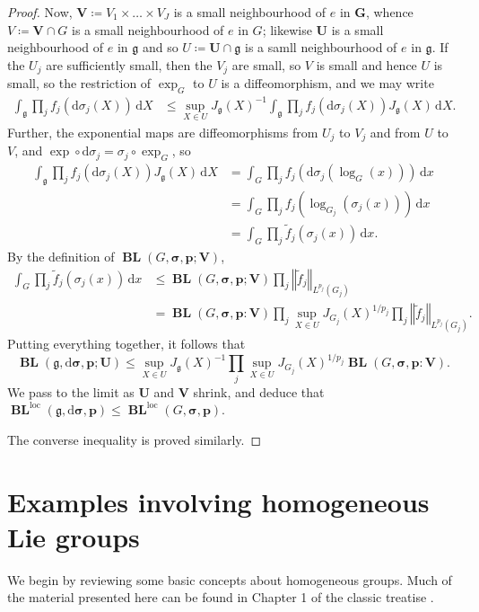 \documentclass[12pt,twoside,a4paper]{amsart}
\theoremstyle{definition}
\theoremstyle{remark}
\numberwithin{equation}{section}
\newcommand{\Lie}[1]{\mathfrak{#1}}
\newcommand{\loc}{\mathrm{loc}}
\newcommand{\wrt}[1]{\,\mathrm{d} #1}
\newcommand{\BL}{\operatorname{\mathbf{BL}}}
\newcommand{\bss}{\boldsymbol{\sigma}}
\newcommand{\bsDs}{\boldsymbol{\mathrm{d}\sigma}}
\newcommand{\bsp}{\boldsymbol{p}}
\newcommand{\bsg}{\boldsymbol{\Lie{g}}}
\newcommand{\bsG}{\boldsymbol{G}}
\newcommand{\bsU}{\boldsymbol{U}}
\newcommand{\bsV}{\boldsymbol{V}}
\newcommand{\norm}[1]{\left\Vert #1 \right\Vert}
\newcommand{\lpar}{\left( }
\newcommand{\rpar}{\right) }
\begin{document}
\begin{proof}
Now,  $\bsV \coloneqq  V_1 \times \dots \times V_J$ is a small neighbourhood of $e$ in $\bsG$, whence $V \coloneqq  \bsV \cap G$ is a small neighbourhood of $e$ in $G$; likewise $\bsU$ is a small neighbourhood of $e$ in $\bsg$ and so $U \coloneqq  \bsU \cap \Lie{g}$ is a samll neighbourhood of $e$ in $\Lie{g}$.
If the $U_j$ are sufficiently small, then the $V_j$ are small, so $V$ is small and hence $U$ is small, so the restriction of $\exp_G$ to $U$ is a diffeomorphism, and we may write
\begin{align*}
 \int_{\Lie{g}} \prod_j f_j\lpar \mathrm{d}\sigma_j(X)\rpar  \wrt X 
&\leq \sup_{X \in U} J_{\Lie{g}}(X)^{-1}  
	\int_{\Lie{g}} \prod_j f_j\lpar \mathrm{d}\sigma_j(X)\rpar J_{\Lie{g}}(X) \wrt X .
\end{align*}
Further, the exponential maps are diffeomorphisms from $U_j$ to $V_j$ and from $U$ to $V$, and $\exp \circ \mathrm{d}\sigma_j = \sigma_j \circ \exp_G$, so
\begin{align*} 
 \int_{\Lie{g}} \prod_j f_j\lpar \mathrm{d}\sigma_j(X)\rpar J_{\Lie{g}}(X) \wrt X 
&=  \int_{G} \prod_j f_j\lpar \mathrm{d}\sigma_j\lpar \log _{G}(x)\rpar \rpar \wrt x\\
&= \int_{G} \prod_j f_j(\log _{G_{j}}\lpar \sigma_j(x)\rpar )\wrt x\\
&= \int_{G} \prod_j \tilde f_j(\sigma_j(x))\wrt x .
\end{align*}
By the definition of $\BL(G,\bss ,\bsp; \bsV)$,
\begin{align*}
 \int_{G} \prod_j \tilde f_j(\sigma_j(x)) \wrt x 
&\leq\BL(G,\bss ,\bsp; \bsV) \prod_j \norm{  \tilde f_j }_{L^{p_j}(G_j)}  \\
&=\BL(G,\bss ,\bsp: \bsV) \prod_j \sup_{X \in U} J_{G_j}(X)^{1/p_j} \prod_j \norm{  \tilde f_j }_{L^{p_j}(G_j)} .
\end{align*}
Putting everything together, it follows that
\[
\BL(\Lie{g},\bsDs ,\bsp; \bsU) 
\leq \sup_{X \in U} J_{\Lie{g}}(X)^{-1}  \prod_j \sup_{X \in U} J_{G_j}(X)^{1/p_j} \BL(G,\bss ,\bsp: \bsV) .
\]
We pass to the limit as $\bsU$ and $\bsV$ shrink, and deduce that $\BL^{\loc}(\Lie{g},\bsDs ,\bsp) \leq 
\BL^{\loc}(G,\bss ,\bsp)$.

The converse inequality is proved similarly. 
\end{proof}



\section{Examples involving homogeneous Lie groups}\label{sec:nilpotent}
We begin by reviewing some basic concepts about homogeneous groups. 
Much of the material presented here can be found in Chapter 1 of the classic treatise \cite{FS82}.
\end{document}

